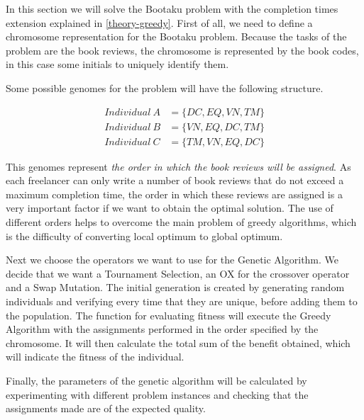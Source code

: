In this section we will solve the Bootaku problem with the completion times extension explained in \ref{theory-greedy}. First of all, we need to define a chromosome representation for the Bootaku problem. Because the tasks of the problem are the book reviews, the chromosome is represented by the book codes, in this case some initials to uniquely identify them.

Some possible genomes for the problem will have the following structure.

\begin{align}
    Individual\ A &= \{ DC, EQ, VN, TM \}\\
    Individual\ B &= \{ VN, EQ, DC, TM \}\\
    Individual\ C &= \{ TM, VN, EQ, DC \}
\end{align}

This genomes represent \textit{the order in which the book reviews will be assigned}. As each freelancer can only write a number of book reviews that do not exceed a maximum completion time, the order in which these reviews are assigned is a very important factor if we want to obtain the optimal solution. The use of different orders helps to overcome the main problem of greedy algorithms, which is the difficulty of converting local optimum to global optimum.

Next we choose the operators we want to use for the Genetic Algorithm. We decide that we want a Tournament Selection, an OX for the crossover operator and a Swap Mutation. The initial generation is created by generating random individuals and verifying every time that they are unique, before adding them to the population. The function for evaluating fitness will execute the Greedy Algorithm with the assignments performed in the order specified by the chromosome. It will then calculate the total sum of the benefit obtained, which will indicate the fitness of the individual.

Finally, the parameters of the genetic algorithm will be calculated by experimenting with different problem instances and checking that the assignments made are of the expected quality.


